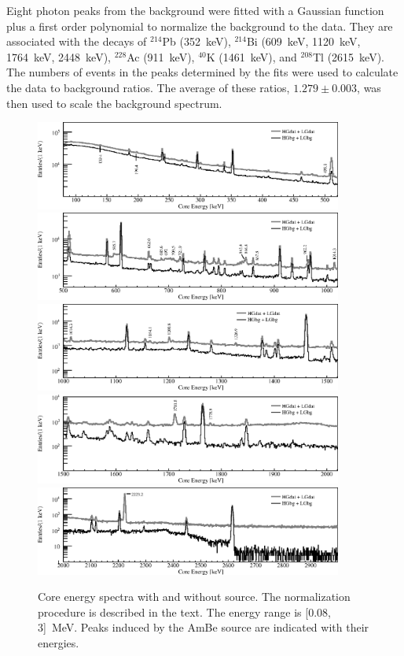 Eight photon peaks from the background were fitted with a Gaussian
function plus a first order polynomial to normalize the background to
the data.  They are associated with the decays of $^{214}$Pb
(352~keV), $^{214}$Bi (609~keV, 1120~keV, 1764~keV, 2448~keV),
$^{228}$Ac (911~keV), $^{40}$K (1461~keV), and $^{208}$Tl (2615~keV).
The numbers of events in the peaks determined by the fits were used to
calculate the data to background ratios. The average of these ratios,
$1.279 \pm 0.003$, was then used to scale the background spectrum.

\begin{figure}[tbhp]
  \centering
  \includegraphics[width=0.9\textwidth,clip]{spectra_0_520keV}
  \includegraphics[width=0.9\textwidth,clip]{spectra_500_1020keV}
  \includegraphics[width=0.9\textwidth,clip]{spectra_1000_1520keV}
  \includegraphics[width=0.9\textwidth,clip]{spectra_1500_2020keV}
  \includegraphics[width=0.9\textwidth,clip]{spectra_2_3MeV}
  \caption{Core energy spectra with and without source. The
    normalization procedure is described in the text. The energy range
    is [0.08, 3]~MeV. Peaks induced by the AmBe source are indicated
    with their energies.}
  \label{fig:neu:spec}
\end{figure}

